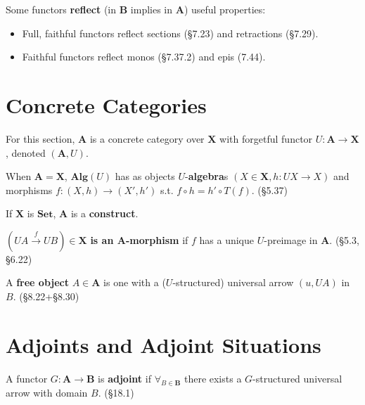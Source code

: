 \documentclass[10pt,twocolumn,letterpaper]{article}
\newcommand{\defn}[1]{{\bf #1}}
\begin{document}
  Some functors \defn{reflect} (in $\mathbf{B}$ implies in $\mathbf{A}$) useful properties:
  \begin{itemize}
      \item Full, faithful functors reflect sections (\S7.23) and retractions (\S7.29).
      \item Faithful functors reflect monos (\S7.37.2) and epis (7.44).
  \end{itemize}


\section{Concrete Categories}

  For this section, $\mathbf{A}$ is a concrete category over $\mathbf{X}$
  with forgetful functor $U : \mathbf{A} \to \mathbf{X}$, denoted $(\mathbf{A}, U)$.

  When $\mathbf{A} = \mathbf{X}$, $\mathbf{Alg}(U)$ has as objects
  $U$-\defn{algebra}s $(X \in \mathbf{X}, h : UX \to X)$ and morphisms
  $f : (X,h) \to (X',h')$ s.t. $f \circ h = h' \circ T(f)$. (\S5.37)

  If $\mathbf{X}$ is $\mathbf{Set}$, $\mathbf{A}$ is a \defn{construct}.

  $(UA \overset{f}{\to} UB) \in \mathbf{X}$ \defn{is an $\mathbf{A}$-morphism}
  if $f$ has a unique $U$-preimage in $\mathbf{A}$. (\S5.3, \S6.22)


  A \defn{free object} $A \in \mathbf{A}$ is one with a ($U$-structured)
  universal arrow $(u,UA)$ in $B$. (\S8.22+\S8.30)


\section{Adjoints and Adjoint Situations}

  A functor $G : \mathbf{A} \to \mathbf{B}$ is \defn{adjoint} if
  $\forall_{B \in \mathbf{B}}$ there exists a $G$-structured universal
  arrow with domain $B$.  (\S18.1)
\end{document}
